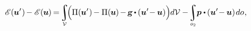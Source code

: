 \nopagebreak\vspace{-0.25em}
\begin{equation*}
\potentialenergyfunctional \hspace{.16ex} (\hspace{-0.1ex} \bm{u}' \hspace{.1ex}) \hspace{-0.2ex}
- \potentialenergyfunctional \hspace{.16ex}
(\hspace{-0.1ex} \bm{u} \hspace{-0.1ex}) \hspace{-0.2ex}
= \hspace{-0.3ex}
   \scalebox{.9}{$
      \displaystyle \integral \displaylimits_{\mathcal{V}}
   $}
   \hspace{-0.44ex}
   \Bigl(
      \potentialenergydensity (\hspace{-0.1ex}\bm{u}'\hspace{.1ex}) \hspace{-0.2ex}
      - \potentialenergydensity (\hspace{-0.1ex} \bm{u} \hspace{-0.1ex})
      \hspace{-0.2ex} - \hspace{-0.2ex}
      \volumeloadvector \hspace{-0.17ex} \dotp \hspace{-0.1ex}
      ( \bm{u}' \hspace{-0.4ex} - \hspace{-0.1ex} \bm{u} )
   \Bigr) \hspace{-0.1ex} d\mathcal{V}
   - \hspace{-0.3ex}
   \scalebox{.9}{$ \displaystyle\integral \displaylimits_{o_2} $} \hspace{-0.1ex}
   \bm{p} \dotp \hspace{-0.1ex}
   ( \bm{u}' \hspace{-0.4ex} - \hspace{-0.1ex} \bm{u} )
   \hspace{.2ex} do
   \hspace{.1ex}
   ,
\vspace{-0.1em}
\end{equation*}

